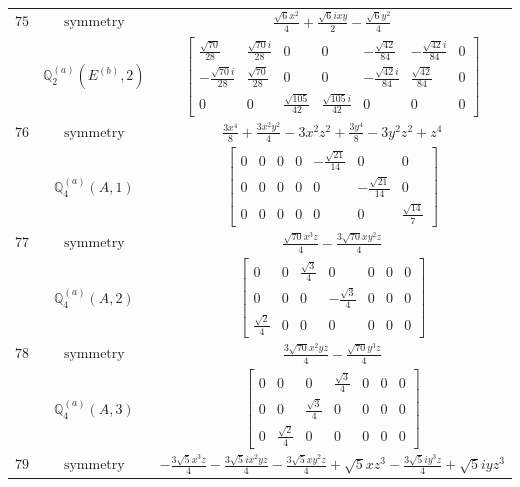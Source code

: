 \documentclass[fleqn,8pt,landscape]{jsarticle}
\begin{document}
\begin{longtable}{ccc}
$ 75 $ & $ \text{symmetry} $ & $ \frac{\sqrt{6} x^{2}}{4} + \frac{\sqrt{6} i x y}{2} - \frac{\sqrt{6} y^{2}}{4} $ \\
$  $ & $ \mathbb{Q}_{2}^{(a)}(E^{(b)},2) $ & $ \begin{bmatrix} \frac{\sqrt{70}}{28} & \frac{\sqrt{70} i}{28} & 0 & 0 & - \frac{\sqrt{42}}{84} & - \frac{\sqrt{42} i}{84} & 0 \\ - \frac{\sqrt{70} i}{28} & \frac{\sqrt{70}}{28} & 0 & 0 & - \frac{\sqrt{42} i}{84} & \frac{\sqrt{42}}{84} & 0 \\ 0 & 0 & \frac{\sqrt{105}}{42} & \frac{\sqrt{105} i}{42} & 0 & 0 & 0 \end{bmatrix} $ \\ \hline
$ 76 $ & $ \text{symmetry} $ & $ \frac{3 x^{4}}{8} + \frac{3 x^{2} y^{2}}{4} - 3 x^{2} z^{2} + \frac{3 y^{4}}{8} - 3 y^{2} z^{2} + z^{4} $ \\
$  $ & $ \mathbb{Q}_{4}^{(a)}(A,1) $ & $ \begin{bmatrix} 0 & 0 & 0 & 0 & - \frac{\sqrt{21}}{14} & 0 & 0 \\ 0 & 0 & 0 & 0 & 0 & - \frac{\sqrt{21}}{14} & 0 \\ 0 & 0 & 0 & 0 & 0 & 0 & \frac{\sqrt{14}}{7} \end{bmatrix} $ \\ \hline
$ 77 $ & $ \text{symmetry} $ & $ \frac{\sqrt{70} x^{3} z}{4} - \frac{3 \sqrt{70} x y^{2} z}{4} $ \\
$  $ & $ \mathbb{Q}_{4}^{(a)}(A,2) $ & $ \begin{bmatrix} 0 & 0 & \frac{\sqrt{3}}{4} & 0 & 0 & 0 & 0 \\ 0 & 0 & 0 & - \frac{\sqrt{3}}{4} & 0 & 0 & 0 \\ \frac{\sqrt{2}}{4} & 0 & 0 & 0 & 0 & 0 & 0 \end{bmatrix} $ \\ \hline
$ 78 $ & $ \text{symmetry} $ & $ \frac{3 \sqrt{70} x^{2} y z}{4} - \frac{\sqrt{70} y^{3} z}{4} $ \\
$  $ & $ \mathbb{Q}_{4}^{(a)}(A,3) $ & $ \begin{bmatrix} 0 & 0 & 0 & \frac{\sqrt{3}}{4} & 0 & 0 & 0 \\ 0 & 0 & \frac{\sqrt{3}}{4} & 0 & 0 & 0 & 0 \\ 0 & \frac{\sqrt{2}}{4} & 0 & 0 & 0 & 0 & 0 \end{bmatrix} $ \\ \hline
$ 79 $ & $ \text{symmetry} $ & $ - \frac{3 \sqrt{5} x^{3} z}{4} - \frac{3 \sqrt{5} i x^{2} y z}{4} - \frac{3 \sqrt{5} x y^{2} z}{4} + \sqrt{5} x z^{3} - \frac{3 \sqrt{5} i y^{3} z}{4} + \sqrt{5} i y z^{3} $ \\

\end{longtable}
\end{document}
